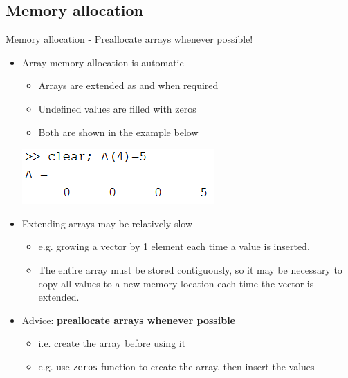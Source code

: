 \documentclass{beamer}
\begin{document}
\subsection{Memory allocation}
\begin{frame}{Memory allocation - Preallocate arrays whenever possible!}{}
	\begin{itemize}
		\item Array memory allocation is automatic
		\begin{itemize}
			\item Arrays are extended as and when required
			\item Undefined values are filled with zeros
			\item Both are shown in the example below
		\end{itemize}
		
		\includegraphics[scale=0.7]{array_memory_allocation}
		
		\item Extending arrays may be relatively slow
		\begin{itemize}
			\item e.g. growing a vector by 1 element each time a value is inserted.
			\item The entire array must be stored contiguously, so it may be necessary to copy
			all values to a new memory location each time the vector is extended.
		\end{itemize}

		\item Advice: \textbf{preallocate arrays whenever possible}
		\begin{itemize}
			\item i.e. create the array before using it
			\item e.g. use \texttt{zeros} function to create the array, then insert the values
		\end{itemize}
	\end{itemize}
\end{frame}
\end{document}
